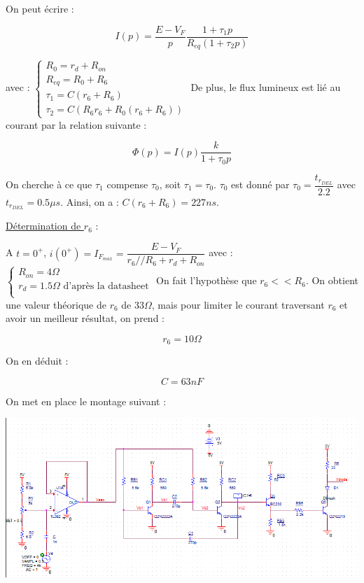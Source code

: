\documentclass[a4paper]{report}
\begin{document}
On peut écrire :

$$I(p) = \dfrac{E-V_F}{p}\dfrac{1+\tau_1p}{R_{eq}(1+\tau_2p)}$$

avec :
\newline
\newline
$\left\{
\begin{array}{l}
  R_0 = r_d + R_{on}\\
  R_{eq} = R_0 + R_6\\
  \tau_1 = C(r_6+R_6)\\
  \tau_2 = C(R_6r_6 + R_0(r_6+R_6))
\end{array}
\right.$
\newline
\newline
De plus, le flux lumineux est lié au courant par la relation suivante : 

$$\Phi(p) =I(p) \dfrac{k}{1+\tau_0p}$$

On cherche  à ce que $\tau_1$ compense $\tau_0$, soit $\tau_1 = \tau_0$.
$\tau_0$ est donné par $\tau_0 = \dfrac{t_{r_{DEL}}}{2.2}$ avec $t_{r_{DEL}} = 0.5\mu s$.
Ainsi, on a : $C(r_6+R_6) = 227ns$.\newline

\underline{Détermination de $r_6$} :\newline

A $t = 0^+$, $i(0^+) = I_{F_{max}} = \dfrac{E-V_F}{r_6//R_6 + r_d + R_{on}}$ avec :\newline
\newline
$\left\{
\begin{array}{l}
  R_{on} = 4\Omega\\
  r_d = 1.5\Omega \mbox{    d'après la datasheet}\\
\end{array}
\right.$
\newline
\newline
On fait l'hypothèse que $r_6<<R_6$. On obtient une valeur théorique de $r_6$ de $33\Omega$, mais pour limiter le courant traversant $r_6$ et avoir un meilleur résultat, on prend :

$$r_6 = 10\Omega$$

On en déduit :

$$C = 63nF$$

On met en place le montage suivant :

\begin{center}
\includegraphics[width=1\textwidth]{Montage_DEL.PNG}
\end{center}
\end{document}
